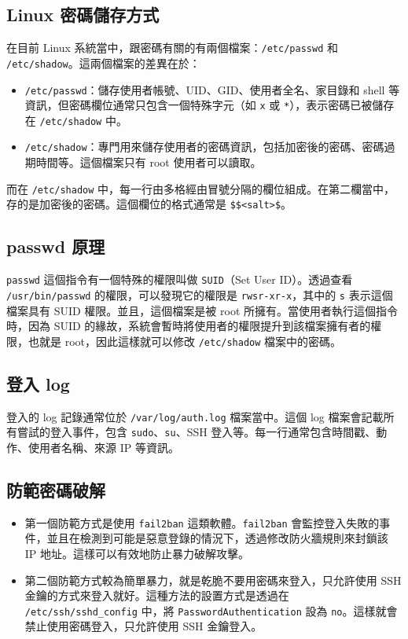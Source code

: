 \documentclass[12pt]{article}
\begin{document}
\subsection{Linux 密碼儲存方式}
在目前 Linux 系統當中，跟密碼有關的有兩個檔案：\texttt{/etc/passwd} 和 \texttt{/etc/shadow}。這兩個檔案的差異在於：
\begin{itemize}
  \item \texttt{/etc/passwd}：儲存使用者帳號、UID、GID、使用者全名、家目錄和 shell 等資訊，但密碼欄位通常只包含一個特殊字元（如 \texttt{x} 或 \texttt{*}），表示密碼已被儲存在 \texttt{/etc/shadow} 中。
  \item \texttt{/etc/shadow}：專門用來儲存使用者的密碼資訊，包括加密後的密碼、密碼過期時間等。這個檔案只有 root 使用者可以讀取。
\end{itemize}
而在 \texttt{/etc/shadow} 中，每一行由多格經由冒號分隔的欄位組成。在第二欄當中，存的是加密後的密碼。這個欄位的格式通常是 
\texttt{\$<hash type>\$<salt>\$<hashed password>}。


\subsection{passwd 原理}
\texttt{passwd} 這個指令有一個特殊的權限叫做 \texttt{SUID}（Set User ID）。透過查看 \texttt{/usr/bin/passwd} 的權限，可以發現它的權限是 \texttt{rwsr-xr-x}，其中的 \texttt{s} 表示這個檔案具有 SUID 權限。並且，這個檔案是被 root 所擁有。當使用者執行這個指令時，因為 SUID 的緣故，系統會暫時將使用者的權限提升到該檔案擁有者的權限，也就是 root，因此這樣就可以修改 \texttt{/etc/shadow} 檔案中的密碼。

\subsection{登入 log}
登入的 log 記錄通常位於 \texttt{/var/log/auth.log} 檔案當中。這個 log 檔案會記載所有嘗試的登入事件，包含 \texttt{sudo}、\texttt{su}、SSH 登入等。每一行通常包含時間戳、動作、使用者名稱、來源 IP 等資訊。

\subsection{防範密碼破解}
\begin{itemize}
  \item 第一個防範方式是使用 \texttt{fail2ban} 這類軟體。\texttt{fail2ban} 會監控登入失敗的事件，並且在檢測到可能是惡意登錄的情況下，透過修改防火牆規則來封鎖該 IP 地址。這樣可以有效地防止暴力破解攻擊。
  \item 第二個防範方式較為簡單暴力，就是乾脆不要用密碼來登入，只允許使用 SSH 金鑰的方式來登入就好。這種方法的設置方式是透過在 \texttt{/etc/ssh/sshd\_config} 中，將 \texttt{PasswordAuthentication} 設為 \texttt{no}。這樣就會禁止使用密碼登入，只允許使用 SSH 金鑰登入。
\end{itemize}
\end{document}

